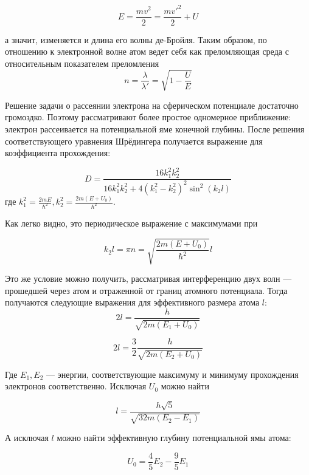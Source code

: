 \documentclass{article}
\begin{document}
\[E = \frac{mv^2}{2} = \frac{mv'^2}{2}+U\]

а значит, изменяется и длина его волны де-Бройля. Таким образом, по отношению к электронной волне атом ведет себя как преломляющая среда с относительным показателем преломления
\begin{equation}
n = \frac{\lambda}{\lambda'} = \sqrt{1 - \frac{U}{E}}
\end{equation}

Решение задачи о рассеянии электрона на сферическом потенциале достаточно громоздко. Поэтому рассматривают более простое одномерное приближение: электрон рассеивается на потенциальной яме конечной глубины. После решения соответствующего уравнения Шрёдингера получается выражение для коэффициента прохождения:

\begin{equation}
D = \frac{16 k_1^2 k_2^2}{16k_1^2 k_2^2 + 4\left(k_1^2-k_2^2\right)^2\sin^2\left(k_2 l\right)}
\end{equation}
где $k_1^2 = \frac{2mE}{\hbar^2}, k_2^2 = \frac{2m(E + U_0)}{\hbar^2}$.

Как легко видно, это периодическое выражение с максимумами при 

\begin{equation}
k_2 l = \pi n = \sqrt{\frac{2m(E + U_0)}{\hbar^2}}l
\end{equation}

Это же условие можно получить, рассматривая интерференцию двух волн --- прошедшей через атом и отраженной от границ атомного потенциала. Тогда получаются следующие выражения для эффективного размера атома $l$:
\begin{equation}
2l = \frac{h}{\sqrt{2m(E_1 + U_0)}}
\end{equation}

\begin{equation}
2l = \frac{3}{2}\frac{h}{\sqrt{2m(E_2 + U_0)}}
\end{equation}

Где $E_1, E_2$ --- энергии, соответствующие максимуму и минимуму прохождения электронов соответственно. Исключая $U_0$ можно найти 

\begin{equation}
l = \frac{h\sqrt{5}}{\sqrt{32m(E_2 - E_1)}}
\end{equation}

\newpage

А исключая $l$ можно найти эффективную глубину потенциальной ямы атома:

\begin{equation}
U_0 = \frac{4}{5}E_2 - \frac{9}{5}E_1
\end{equation}
\end{document}
